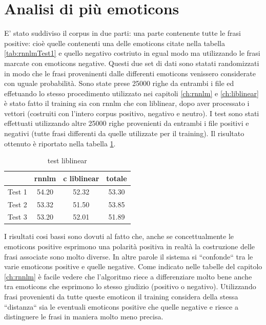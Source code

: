 \documentclass[a4paper,12pt,openright,twoside]{report}
\theoremstyle{definition}
\begin{document}
\section{Analisi di più emoticons}
E' stato suddiviso il corpus in due parti: una parte contenente tutte le frasi positive: cioè quelle contenenti una delle emoticons citate nella tabella \ref{tab:rnnlmTest1} e quello negativo costriuto in egual modo ma utilizzando le frasi marcate con emoticons negative. Questi due set di dati sono statati randomizzati in modo che le frasi proveninenti dalle differenti emoticons venissero considerate con uguale probabilità. Sono state prese 25000 righe da entrambi i file ed effetuando lo stesso procedimento utilizzato nei capitoli \ref{ch:rnnlm} e \ref{ch:liblinear} è stato fatto il training sia con rnnlm che con liblinear, dopo aver processato i vettori (costruiti con l'intero corpus positivo, negativo e neutro).
I test sono stati effettuati utilizzando altre 25000 righe provenienti da entrambi i file positivi e negativi (tutte frasi differenti da quelle utilizzate per il training). Il risultato ottenuto è riportato nella tabella \ref{tab:test2}.
\begin{table}[h]
\begin{center}
\begin{tabular}{|c|c|c|c|}
\hline
& rnnlm & c liblinear & totale \\
\hline
\hline
Test 1 & 54.20 & 52.32 & 53.30 \\
\hline
Test 2 & 53.32 &  51.50 &  53.85  \\
\hline
Test 3 & 53.20 & 52.01 &  51.89 \\
\hline
\end{tabular}
\end{center}
\caption{test liblinear}
\label{tab:test2}
\end{table}

I risultati cosi bassi sono dovuti al fatto che, anche se concettualmente le emoticons positive esprimono una polarità positiva in realtà la costruzione delle frasi associate sono molto diverse. 
In altre parole il sistema si ``confonde`` tra le varie emoticons positive e quelle negative. Come indicato nelle tabelle del capitolo \ref{ch:rnnlm} è facile vedere che l'algoritmo riece a differenziare molto bene anche tra emoticons che esprimono lo stesso giudizio (positivo o negativo). Utilizzando frasi provenienti da tutte queste emoticon il training considera della stessa ``distanza`` sia le eventuali emoticons positive che quelle negative e riesce a distinguere le frasi in maniera molto meno precisa.
\end{document}
